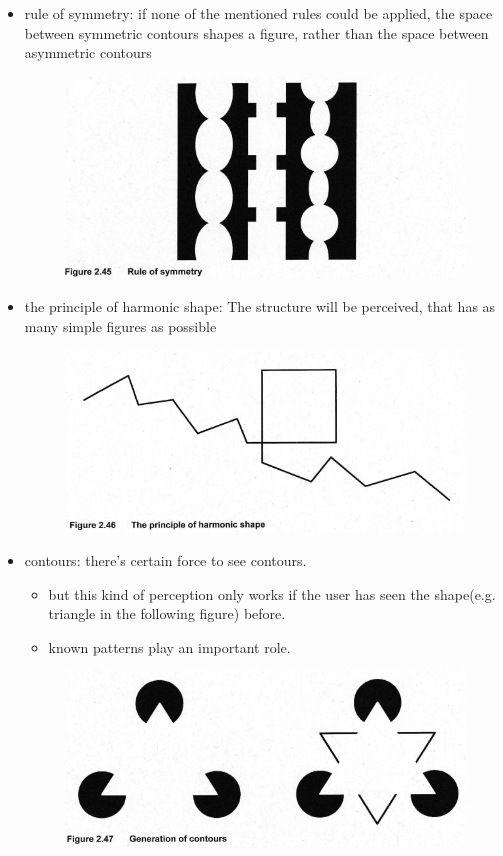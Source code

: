 \documentclass{standalone}
\begin{document}
\begin{itemize}
\begin{itemize}
\begin{figure}[H]
				\end{figure}
		\item rule of symmetry: if none of the mentioned rules could be applied, the space between symmetric contours shapes a figure, rather than the space between asymmetric contours
			\begin{figure}[H]
				\centering
				\includegraphics[width = 0.5\linewidth]{Figures/2_45.png}
			\end{figure}
		\item the principle of harmonic shape: The structure will be perceived, that has as many simple figures as possible
			\begin{figure}[H]
			\centering
			\includegraphics[width = 0.5\linewidth]{Figures/2_46.png}
			\end{figure}
		\item contours: there's certain force to see contours.
			\begin{itemize}
				\item but this kind of perception only works if the user has seen the shape(e.g. triangle in the following figure) before.
				\item known patterns play an important role.
			\end{itemize}
			\begin{figure}[H]
			\centering
			\includegraphics[width = 0.7\linewidth]{Figures/2_47.png}
			\end{figure}
	\end{itemize}
\end{itemize}
\end{document}
